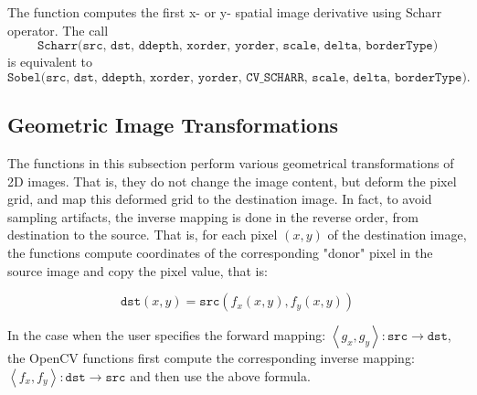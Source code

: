 The function computes the first x- or y- spatial image derivative using Scharr operator. The call
\[\texttt{Scharr(src, dst, ddepth, xorder, yorder, scale, delta, borderType)}\]
is equivalent to
\[\texttt{Sobel(src, dst, ddepth, xorder, yorder, CV\_SCHARR, scale, delta, borderType)}.\] 

\subsection{Geometric Image Transformations}\label{CV.Geometric}

The functions in this subsection perform various geometrical transformations of 2D images. That is, they do not change the image content, but deform the pixel grid, and map this deformed grid to the destination image. In fact, to avoid sampling artifacts, the inverse mapping is done in the reverse order, from destination to the source. That is, for each pixel $(x, y)$ of the destination image, the functions compute coordinates of the corresponding "donor" pixel in the source image and copy the pixel value, that is:

\[\texttt{dst}(x,y)=\texttt{src}(f_x(x,y), f_y(x,y))\]

In the case when the user specifies the forward mapping: $\left<g_x, g_y\right>: \texttt{src} \rightarrow \texttt{dst}$, the OpenCV functions first compute the corresponding inverse mapping: $\left<f_x, f_y\right>: \texttt{dst} \rightarrow \texttt{src}$ and then use the above formula.

